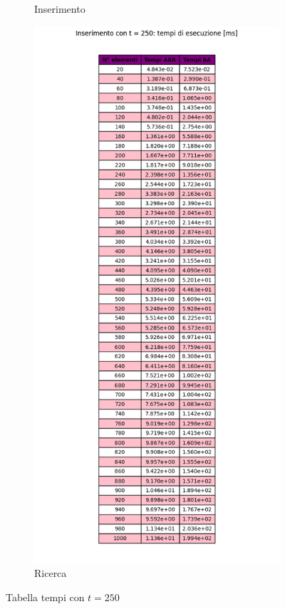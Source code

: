 \begin{figure}[H]
\begin{subfigure}[b]{0.49\textwidth}
        \caption{Inserimento}
        \label{fig:tableinserttimet250}
    \end{subfigure}
    \hfill
    \begin{subfigure}[b]{0.49\textwidth}
        \centering
        \includegraphics[width=\textwidth]{tables/search-ms-t250.png}
        \caption{Ricerca}
        \label{fig:tablesearchtimet250}
    \end{subfigure}
    \caption{Tabella tempi con $t=250$}
    \label{fig:tabletimest250}
\end{figure}


